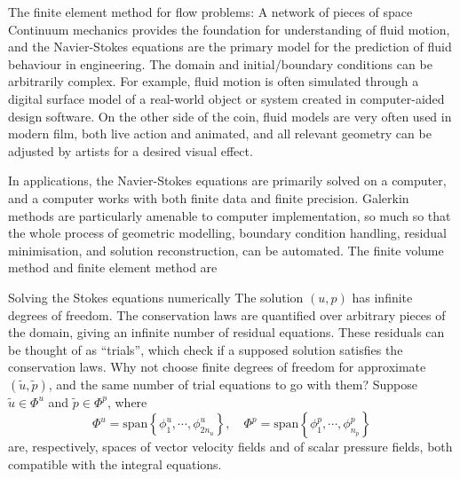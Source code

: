 \documentclass{article}
\begin{document}
\newpage
\vskip 0.2in
{\large The finite element method for flow problems: A network of pieces of space}
\vskip 0.2in
Continuum mechanics provides the foundation for understanding of fluid motion, and the Navier-Stokes equations
are the primary model for the prediction of fluid behaviour in engineering.
The domain and initial/boundary conditions can be arbitrarily complex. For example, fluid motion is often simulated
through a digital surface model of a real-world object or system created in computer-aided design software.
On the other side of the coin, fluid models are very often used in modern film, both live action and animated,
and all relevant geometry can be adjusted by artists for a desired visual effect.

In applications, the Navier-Stokes equations are primarily
solved on a computer, and a computer works with both finite data and finite precision.
Galerkin methods 
are particularly amenable to computer implementation, so much so that the whole process of geometric modelling, boundary condition handling,
residual minimisation, and solution reconstruction, can be automated. The finite volume method and finite element method are

\newpage
\vskip 0.2in
{\large Solving the Stokes equations numerically}
\vskip 0.2in
\noindent
The solution {\large $(u,p)$} has infinite degrees of freedom.
The conservation laws are quantified over arbitrary pieces of the domain,
giving an infinite number of residual equations. These residuals can be thought of
as ``trials'', which check if a supposed solution satisfies the conservation laws.
Why not choose finite degrees of freedom for approximate {\large $(\tilde{u}, \tilde{p})$},
and the same number of trial equations to go with them?
Suppose $\tilde{u} \in \Phi^u$ and $\tilde{p} \in \Phi^p$, where
    $$\Phi^u = \text{span}\left\{\phi^u_1,\cdots,\phi^u_{2n_u}\right\},\quad 
        \Phi^p = \text{span}\left\{\phi^p_1,\cdots,\phi^p_{n_p}\right\}$$
are, respectively, spaces of vector velocity fields and of scalar pressure fields, both compatible with the integral equations.

\end{document}
